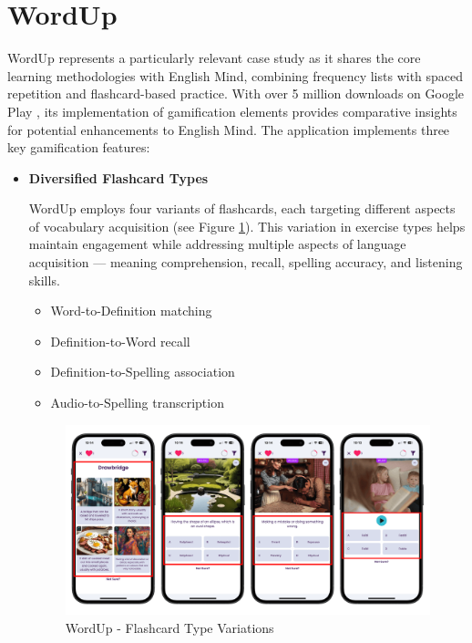 \section{WordUp}

WordUp represents a particularly relevant case study as it shares the core learning methodologies with English Mind, combining frequency lists with spaced repetition and flashcard-based practice. With over 5 million downloads on Google Play \cite{cite:wordup_google_play}, its implementation of gamification elements provides comparative insights for potential enhancements to English Mind. The application implements three key gamification features:

\begin{itemize}
    \item \textbf{Diversified Flashcard Types}

    WordUp employs four variants of flashcards, each targeting different aspects of vocabulary acquisition (see Figure \ref{fig:wordup-flashcard-types}). This variation in exercise types helps maintain engagement while addressing multiple aspects of language acquisition — meaning comprehension, recall, spelling accuracy, and listening skills.
    
    \begin{itemize}
        \item Word-to-Definition matching
        \item Definition-to-Word recall
        \item Definition-to-Spelling association
        \item Audio-to-Spelling transcription
    \end{itemize}

    \begin{figure}[!h]
        \includegraphics[width=1\textwidth]{src/figures/wordup-flashcard-types.png}
        \caption{WordUp - Flashcard Type Variations}
        \label{fig:wordup-flashcard-types}
    \end{figure}
    

\end{itemize}
